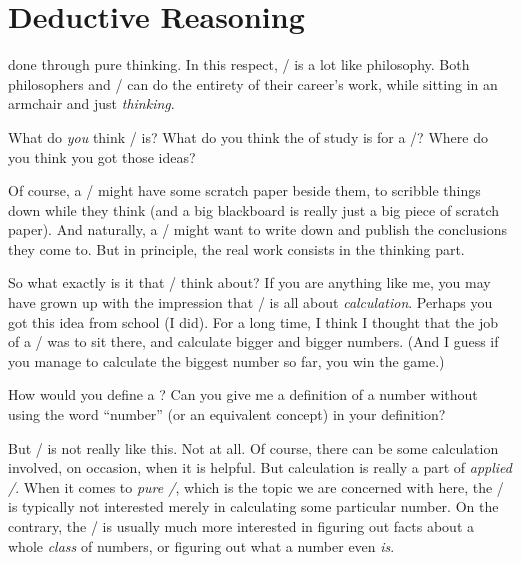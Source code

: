 \documentclass[../../../main.tex]{subfiles}
\begin{document}
\chapter{Deductive Reasoning}

 done through pure thinking. In this respect, \math/ is a lot like philosophy. Both philosophers and \mathers/ can do the entirety of their career's work, while sitting in an armchair and just \emph{thinking}. 

\begin{ponder}
  What do \emph{you} think \math/ is? What do you think the  of study is for a \mather/? Where do you think you got those ideas? 
\end{ponder}

Of course, a \mather/ might have some scratch paper beside them, to scribble things down while they think (and a big blackboard is really just a big piece of scratch paper). And naturally, a \mather/ might want to write down and publish the conclusions they come to. But in principle, the real work consists in the thinking part.

So what exactly is it that \mathers/ think about? If you are anything like me, you may have grown up with the impression that \math/ is all about \emph{calculation}. Perhaps you got this idea from school (I did). For a long time, I think I thought that the job of a \mather/ was to sit there, and calculate bigger and bigger numbers. (And I guess if you manage to calculate the biggest number so far, you win the game.)

\begin{ponder}
  How would you define a ? Can you give me a definition of a number without using the word ``number'' (or an equivalent concept) in your definition?
\end{ponder}

But \math/ is not really like this. Not at all. Of course, there can be some calculation involved, on occasion, when it is helpful. But calculation is really a part of \emph{applied \math/}. When it comes to \emph{pure \math/}, which is the topic we are concerned with here, the \mather/ is typically not interested merely in calculating some particular number. On the contrary, the \mather/ is usually much more interested in figuring out facts about a whole \emph{class} of numbers, or figuring out what a number even \emph{is}.
\end{document}
